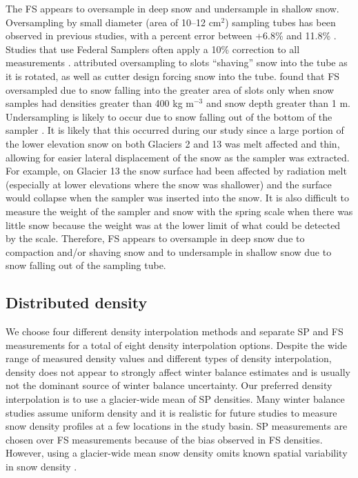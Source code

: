 \documentclass[twocolumn, letterpaper]{igs}
\begin{document}
The FS appears to oversample in deep snow and undersample in shallow snow. Oversampling by small diameter (area of 10--12 cm$^2$) sampling tubes has been observed in previous studies, with a percent error between +6.8\% and 11.8\% \citep{Work1965, Fames1982, Conger2009}. Studies that use Federal Samplers often apply a 10\% correction to all measurements \citep[e.g.][]{Molotch2005}. \cite{Dixon2012} attributed oversampling to slots ``shaving'' snow into the tube as it is rotated, as well as cutter design forcing snow into the tube. \cite{Beaumont1963} found that FS oversampled due to snow falling into the greater area of slots only when snow samples had densities greater than 400 kg m$^{-3}$ and snow depth greater than 1 m. Undersampling is likely to occur due to snow falling out of the bottom of the sampler \citep{Turcan1975}. It is likely that this occurred during our study since a large portion of the lower elevation snow on both Glaciers 2 and 13 was melt affected and thin, allowing for easier lateral displacement of the snow as the sampler was extracted. For example, on Glacier 13 the snow surface had been affected by radiation melt (especially at lower elevations where the snow was shallower) and the surface would collapse when the sampler was inserted into the snow. It is also difficult to measure the weight of the sampler and snow with the spring scale when there was little snow because the weight was at the lower limit of what could be detected by the scale. Therefore, FS appears to oversample in deep snow due to compaction and/or shaving snow and to undersample in shallow snow due to snow falling out of the sampling tube. 

\subsection{Distributed density}

We choose four different density interpolation methods and separate SP and FS measurements for a total of eight density interpolation options. Despite the wide range of measured density values and different types of density interpolation, density does not appear to strongly affect winter balance estimates and is usually not the dominant source of winter balance uncertainty. Our preferred density interpolation is to use a glacier-wide mean of SP densities. Many winter balance studies assume uniform density \citep[e.g.][]{Elder1991,McGrath2015,Cullen2017} and it is realistic for future studies to measure snow density profiles at a few locations in the study basin. SP measurements are chosen over FS measurements because of the bias observed in FS densities. However, using a glacier-wide mean snow density omits known spatial variability in snow density \citep{Wetlaufer2016}. 
\end{document}
